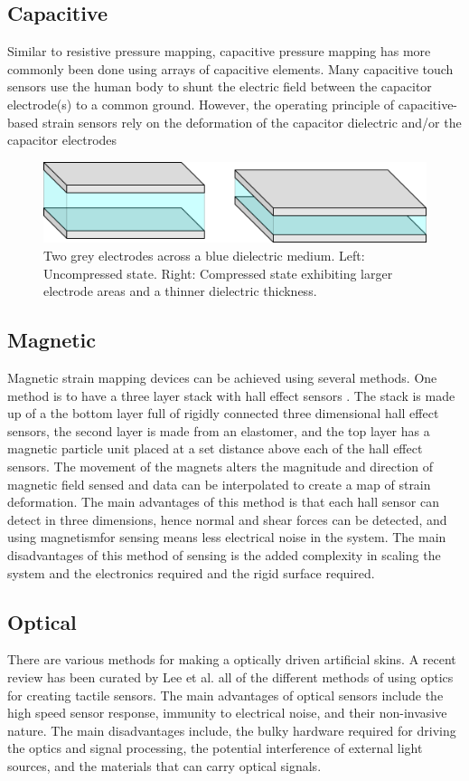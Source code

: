 \subsection{Capacitive}
Similar to resistive pressure mapping, capacitive pressure mapping has more commonly been done using arrays of capacitive elements. Many capacitive touch sensors use the human body to shunt the electric field between the capacitor electrode(s) to a common ground. However, the operating principle of capacitive-based strain sensors rely on the deformation of the capacitor dielectric and/or the capacitor electrodes \cite{Sapra2023,Zhu2021,Liang2015}
\begin{figure}[H]
	\centering
	\includegraphics[width=0.6\linewidth]{Figures/cap_deformed_states_x2_crop.png}
	\caption{Two grey electrodes across a blue dielectric medium. Left: Uncompressed state. Right: Compressed state exhibiting larger electrode areas and a thinner dielectric thickness.}
	\label{fig:cap_deformed_cube}
\end{figure}


\subsection{Magnetic}
Magnetic strain mapping devices can be achieved using several methods. One method is to have a three layer stack with hall effect sensors \cite{Yan2021}. The stack is made up of a the bottom layer full of rigidly connected three dimensional hall effect sensors, the second layer is made from an elastomer, and the top layer has a magnetic particle unit placed at a set distance above each of the hall effect sensors. The movement of the magnets alters the magnitude and direction of magnetic field sensed and data can be interpolated to create a map of strain deformation. The main advantages of this method is that each hall sensor can detect in three dimensions, hence normal and shear forces can be detected, and using magnetismfor sensing means less electrical noise in the system. The main disadvantages of this method of sensing is the added complexity in scaling the system and the electronics required and the rigid surface required.  

\subsection{Optical}
There are various methods for making a optically driven artificial skins. A recent review has been curated by Lee et al. \cite{Lee2023} all of the different methods of using optics for creating tactile sensors. The main advantages of optical sensors include the high speed sensor response, immunity to electrical noise, and their non-invasive nature. The main disadvantages include, the bulky hardware required for driving the optics and signal processing, the potential interference of external light sources, and the materials that can carry optical signals. 


